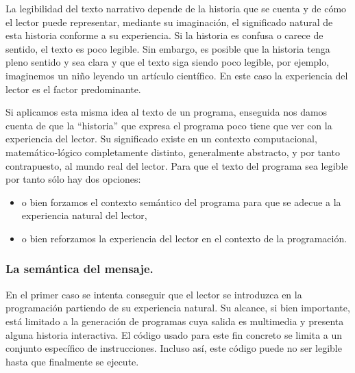 \documentclass{llncs}
\begin{document}
La legibilidad del texto narrativo depende de la historia que se cuenta y de cómo el lector puede representar, mediante su imaginación, el significado natural de esta historia conforme a su experiencia. Si la historia es confusa o carece de sentido, el texto es poco legible. Sin embargo, es posible que la historia tenga pleno sentido y sea clara y que el texto siga siendo poco legible, por ejemplo, imaginemos un niño leyendo un artículo científico. En este caso la experiencia del lector es el factor predominante. 

Si aplicamos esta misma idea al texto de un programa, enseguida nos damos cuenta de que la ``historia'' que expresa el programa poco tiene que ver con la experiencia del lector. Su significado existe en un contexto computacional, matemático-lógico completamente distinto, generalmente abstracto, y por tanto contrapuesto, al mundo real del lector. Para que el texto del programa sea legible por tanto sólo hay dos opciones: 

\begin{itemize}
\item o bien forzamos el contexto semántico del programa para que se adecue a la experiencia natural del lector, 
\item o bien reforzamos la experiencia del lector en el contexto de la programación. 
\end{itemize}

\subsubsection{La semántica del mensaje.}
\label{subsec:message}

En el primer caso se intenta conseguir que el lector se introduzca en la programación partiendo de su experiencia natural. Su alcance, si bien importante, está limitado a la generación de programas cuya salida es multimedia y presenta alguna historia interactiva. El código usado para este fin concreto se limita a un conjunto específico de instrucciones. Incluso así, este código puede no ser legible hasta que finalmente se ejecute. 
\end{document}
